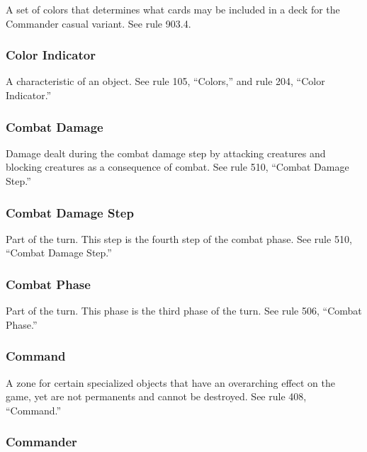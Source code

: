 {{{{{A set of colors that determines what cards may be included in a deck for the Commander casual variant. See rule 903.4.

\subsubsection*{Color Indicator}

A characteristic of an object. See rule 105, “Colors,” and rule 204, “Color Indicator.”

\subsubsection*{Combat Damage}

Damage dealt during the combat damage step by attacking creatures and blocking creatures as a consequence of combat. See rule 510, “Combat Damage Step.”

\subsubsection*{Combat Damage Step}

Part of the turn. This step is the fourth step of the combat phase. See rule 510, “Combat Damage Step.”

\subsubsection*{Combat Phase}

Part of the turn. This phase is the third phase of the turn. See rule 506, “Combat Phase.”

\subsubsection*{Command}

A zone for certain specialized objects that have an overarching effect on the game, yet are not permanents and cannot be destroyed. See rule 408, “Command.”

\subsubsection*{Commander}

}}}}}
